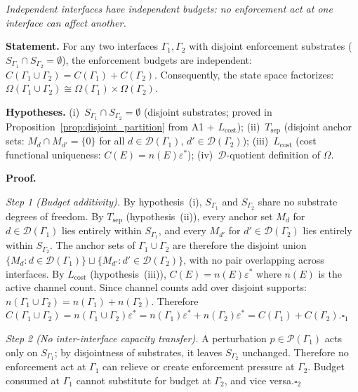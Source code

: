\documentclass[11pt]{article}
\theoremstyle{remark}
\begin{document}
\begin{tcolorbox}[apfbox, title={Lemma $L_{\mathrm{loc}}$ (Locality)}]
\textit{Independent interfaces have independent budgets: no enforcement act at one interface can affect another.}

\smallskip\noindent\textbf{Statement.}  For any two interfaces $\Gamma_1, \Gamma_2$ with disjoint enforcement substrates ($S_{\Gamma_1} \cap S_{\Gamma_2} = \emptyset$), the enforcement budgets are independent: $C(\Gamma_1 \cup \Gamma_2) = C(\Gamma_1) + C(\Gamma_2)$.  Consequently, the state space factorizes: $\Omega(\Gamma_1 \cup \Gamma_2) \cong \Omega(\Gamma_1) \times \Omega(\Gamma_2)$.

\smallskip\noindent\textbf{Hypotheses.}  (i)~$S_{\Gamma_1} \cap S_{\Gamma_2} = \emptyset$ (disjoint substrates; proved in Proposition~\ref{prop:disjoint_partition} from A1 + $L_{\mathrm{cost}}$); (ii)~$T_{\mathrm{sep}}$ (disjoint anchor sets: $M_d \cap M_{d'} = \{0\}$ for all $d \in \mathcal{D}(\Gamma_1)$, $d' \in \mathcal{D}(\Gamma_2)$); (iii)~$L_{\mathrm{cost}}$ (cost functional uniqueness: $C(E) = n(E)\varepsilon^*$); (iv)~$\mathcal{D}$-quotient definition of $\Omega$.

\smallskip\noindent\textbf{Proof.}

\textit{Step 1 (Budget additivity).}  By hypothesis~(i), $S_{\Gamma_1}$ and $S_{\Gamma_2}$ share no substrate degrees of freedom.  By $T_{\mathrm{sep}}$ (hypothesis~(ii)), every anchor set $M_d$ for $d \in \mathcal{D}(\Gamma_1)$ lies entirely within $S_{\Gamma_1}$, and every $M_{d'}$ for $d' \in \mathcal{D}(\Gamma_2)$ lies entirely within $S_{\Gamma_2}$.  The anchor sets of $\Gamma_1 \cup \Gamma_2$ are therefore the disjoint union $\{M_d : d \in \mathcal{D}(\Gamma_1)\} \sqcup \{M_{d'} : d' \in \mathcal{D}(\Gamma_2)\}$, with no pair overlapping across interfaces.  By $L_{\mathrm{cost}}$ (hypothesis~(iii)), $C(E) = n(E)\varepsilon^*$ where $n(E)$ is the active channel count.  Since channel counts add over disjoint supports: $n(\Gamma_1 \cup \Gamma_2) = n(\Gamma_1) + n(\Gamma_2)$.  Therefore $C(\Gamma_1 \cup \Gamma_2) = n(\Gamma_1 \cup \Gamma_2)\varepsilon^* = n(\Gamma_1)\varepsilon^* + n(\Gamma_2)\varepsilon^* = C(\Gamma_1) + C(\Gamma_2)$.\hfill$\square_1$

\textit{Step 2 (No inter-interface capacity transfer).}  A perturbation $p \in \mathcal{P}(\Gamma_1)$ acts only on $S_{\Gamma_1}$; by disjointness of substrates, it leaves $S_{\Gamma_2}$ unchanged.  Therefore no enforcement act at $\Gamma_1$ can relieve or create enforcement pressure at $\Gamma_2$.  Budget consumed at $\Gamma_1$ cannot substitute for budget at $\Gamma_2$, and vice versa.\hfill$\square_2$


\end{tcolorbox}
\end{document}

